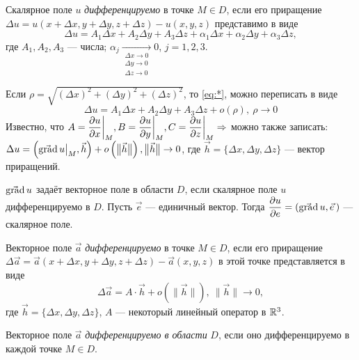 \documentclass[a4paper,10pt]{article}
\begin{document}
	\begin{defn}
		Скалярное поле $u$ \textit{дифференцируемо
		} в точке $M \in D$, если его приращение $\Delta u = u(x + \Delta x, y + \Delta y, z + \Delta z) - u(x, y, z)$ представимо в виде 
		\begin{equation}\tag{*}\label{eq:*}
			\Delta u = A_1 \Delta x + A_2 \Delta y + A_3 \Delta z + \alpha_1 \Delta x + \alpha_2 \Delta y + \alpha_3 \Delta z,
		\end{equation}
		где $A_1, A_2, A_3$ --- числа; $\alpha_j \mathop{\longrightarrow}\limits_{\begin{smallmatrix} \Delta x \to 0 \\ \Delta y \to 0 \\ \Delta z \to 0 \end{smallmatrix}}0$, $j=1, 2, 3$. 
		
		Если $\rho = \sqrt{(\Delta x)^2 + (\Delta y)^2 + (\Delta z)^2}$, то \eqref{eq:*}, можно переписать в виде 
		$$\Delta u = A_1 \Delta x + A_2 \Delta y + A_3 \Delta z + o(\rho), ~ \rho \to 0$$
		Известно, что $A = \dfrac{\partial u}{\partial x} \bigg|_M, B = \dfrac{\partial u}{\partial y} \bigg|_M, C = \dfrac{\partial u}{\partial z} \bigg|_M \Rightarrow$ можно также записать: $\Delta u = \left( \mathop{\operatorname{g}\!\vec{\operatorname{ra}}\!\operatorname{d}} u \big|_M, \vec{h} \right) + o \left( \big\| \vec{h} \big\| \right), \big\| \vec{h} \big\| \to 0$, где $\vec{h} = \{\Delta x, \Delta y, \Delta z\}$ --- вектор приращений.
	\end{defn}
	
	\begin{note}
		$\mathop{\operatorname{g}\!\vec{\operatorname{ra}}\!\operatorname{d}} u$ задаёт векторное поле в области $D$, если скалярное поле $u$ дифференцируемо в $D$. Пусть $\vec{e}$ --- единичный вектор. Тогда $\dfrac{\partial u}{\partial e} = (\mathop{\operatorname{g}\!\vec{\operatorname{ra}}\!\operatorname{d}} u, \vec{e}\,)$ --- скалярное поле.
	\end{note}
	
	\begin{defn}
		Векторное поле $\vec{a}$ \textit{дифференцируемо} в точке $M \in D$, если его приращение $\Delta \vec{a} = \vec{a}(x + \Delta x, y + \Delta y, z + \Delta z) - \vec{a}(x, y, z)$ в этой точке представляется в виде
		\begin{equation}\tag{**}\label{eq:**}
			\Delta \vec{a} = A \cdot \vec{h} + o \left( \big\| \vec{h} \big\| \right), ~ \big\| \vec{h} \big\| \to 0,
		\end{equation}
		где $\vec{h} = \{\Delta x, \Delta y, \Delta z\}$, $A$ --- некоторый линейный оператор в ${\mathbb R}^3$.
		
		Векторное поле $\vec{a}$ \textit{дифференцируемо в области} $D$, если оно дифференцируемо в каждой точке $M \in D$. 
	\end{defn}
	
\end{document}
